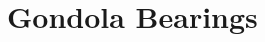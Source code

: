 \documentclass[../main.tex]{subfiles}
\begin{document}
\section{Gondola Bearings} \label{gondolaBearings}
\end{document}
